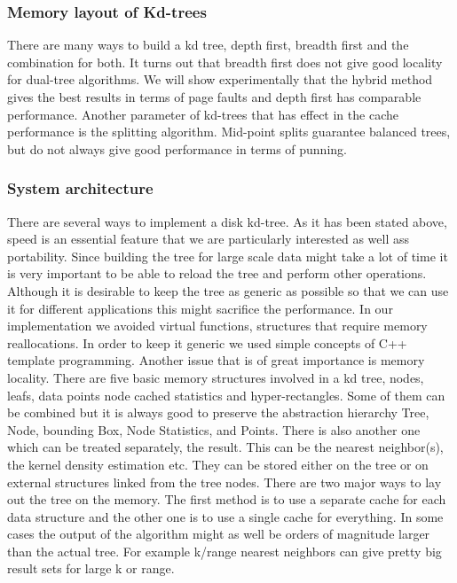 \documentclass[12pt,letterpaper,doublespaced,ETD,dvips,proposal]{gtthesis}
\begin{document}
\begin{Body}
\subsubsection{Memory layout of Kd-trees} There are many ways to
build a kd tree, depth first, breadth first and the combination for
both. It turns out that breadth first does not give good locality
for dual-tree algorithms. We will show experimentally that the
hybrid method gives the best results in terms of page faults and
depth first has comparable performance. Another parameter of
kd-trees that has effect in the cache performance is the splitting
algorithm. Mid-point splits  guarantee balanced trees, but do not
always give good performance in terms of punning.

\subsubsection{System architecture} There are several ways to
implement a disk kd-tree. As it has been stated above, speed is an
essential feature that we are particularly interested as well ass
portability. Since building the tree for large scale data might take
a lot of time it is very important to be able to reload the tree and
perform other operations. Although it is desirable to keep the tree
as generic as possible so that we can use it for different
applications this might sacrifice the performance. In our
implementation we avoided virtual functions, structures that require
memory reallocations. In order to keep it generic we used simple
concepts of C++ template programming. Another issue that is of great
importance is memory locality. There are five basic memory
structures involved in a kd tree, nodes, leafs, data points node
cached statistics and hyper-rectangles. Some of them can be combined
but it is always good to preserve the abstraction hierarchy Tree,
Node, bounding Box, Node Statistics, and Points. There is also
another one which can be treated separately, the result. This can be
the nearest neighbor(s), the kernel density estimation etc. They can
be stored either on the tree or on external structures linked from
the tree nodes. There are two major ways to lay out the tree on the
memory. The first method is to use a separate cache for each data
structure and the other one is to use  a single cache for
everything. In some cases the output of the algorithm might as well
be orders of magnitude larger than the actual tree. For example
k/range nearest neighbors can give pretty big result sets for large
k or range.


\end{Body}
\end{document}
